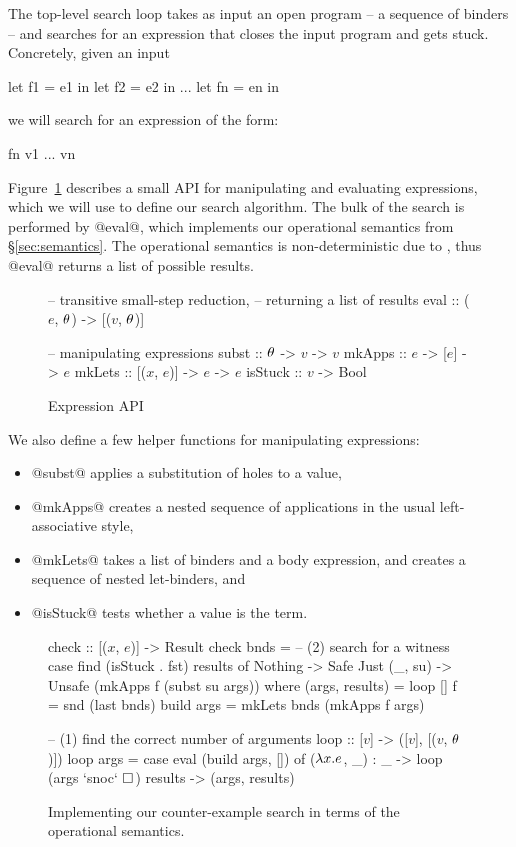 The top-level search loop takes as input an open program -- a sequence
of binders -- and searches for an expression that closes the input
program and gets stuck. Concretely, given an input
%
\begin{code}
  let f1 = e1 in
  let f2 = e2 in
  ...
  let fn = en in
\end{code}
%
we will search for an expression of the form:
%
\begin{code}
  fn v1 ... vn
\end{code}
%
Figure~\ref{fig:expression-api} describes a small API for manipulating
and evaluating \lang expressions, which we will use to define our search
algorithm.
%
The bulk of the search is performed by @eval@, which
implements our operational semantics from \S\ref{sec:semantics}.
%
The operational semantics is non-deterministic due to \gensym,
thus @eval@ returns a list of possible results.
%
\begin{figure}[t]
  \centering
  \begin{mcode}
  -- transitive small-step reduction,
  -- returning a list of results
  eval :: ($e$, $\theta$) -> [($v$, $\theta$)]

  -- manipulating expressions
  subst   :: $\theta$ -> $v$ -> $v$
  mkApps  :: $e$ -> [$e$] -> $e$
  mkLets  :: [($x$, $e$)] -> $e$ -> $e$
  isStuck :: $v$ -> Bool
  \end{mcode}
  \caption{Expression API}
  \label{fig:expression-api}
\end{figure}
%
We also define a few helper functions for manipulating expressions:
\begin{itemize}
\item @subst@ applies a substitution of holes to a value,
\item @mkApps@ creates a nested sequence of applications in the usual
  left-associative style,
\item @mkLets@ takes a list of binders and a body expression, and
  creates a sequence of nested let-binders, and
\item @isStuck@ tests whether a value is the \stuck term.
\end{itemize}
%
\begin{figure*}[t]
  \centering
  \begin{mcode}
  check :: [($x$, $e$)] -> Result
  check bnds =
    -- (2) search for a witness
    case find (isStuck . fst) results of
      Nothing      -> Safe
      Just (_, su) -> Unsafe (mkApps f (subst su args))
    where
      (args, results) = loop []
      f               = snd (last bnds)
      build args      = mkLets bnds (mkApps f args)

      -- (1) find the correct number of arguments
      loop :: [$v$] -> ([$v$], [($v$, $\theta$)])
      loop args = case eval (build args, []) of
        ($\lambda x. e$, _) : _ -> loop (args `snoc` $\square_{}$)
        results      -> (args, results)
  \end{mcode}
  \caption{Implementing our counter-example search in terms of the
    operational semantics.
  }
  \label{fig:search-algo}
\end{figure*}
